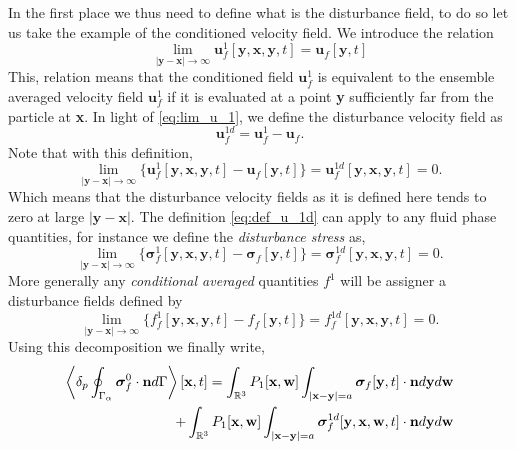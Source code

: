 In the first place we thus need to define what is the disturbance field, to do so let us take the example of the conditioned velocity field.
We introduce the relation 
\begin{equation}
    \lim_{|\textbf{y}-\textbf{x}|\to\infty} 
    \textbf{u}_f^1[\textbf{y},\textbf{x},\textbf{y},t]
    =
    \textbf{u}_f[\textbf{y},t]
    \label{eq:lim_u_1}
\end{equation} 
This, relation means that the conditioned field $\textbf{u}_f^1$ is equivalent to the ensemble averaged velocity field $\textbf{u}_f^1$ if it is evaluated at a point \textbf{y} sufficiently far from the particle at \textbf{x}. 
In light of \ref{eq:lim_u_1}, we define the disturbance velocity field as 
\begin{equation*}
    \textbf{u}_f^{1d}
    =
    \textbf{u}_f^1 
    - 
    \textbf{u}_f. 
    \label{eq:def_u_1d}
\end{equation*}
Note that with this definition, 
\begin{equation*}
    \lim_{|\textbf{y}-\textbf{x}|\to\infty} 
    \{\textbf{u}_f^1[\textbf{y},\textbf{x},\textbf{y},t]
    - \textbf{u}_f[\textbf{y},t]\}
    =
    \textbf{u}_f^{1d}[\textbf{y},\textbf{x},\textbf{y},t]
    = 0.
    \label{eq:lim_u_1d}
\end{equation*} 
Which means that the disturbance velocity fields as it is defined here tends to zero at large $|\textbf{y} - \textbf{x}|$.
The definition \ref{eq:def_u_1d} can apply to any fluid phase quantities,
for instance we define the \textit{disturbance stress} as,
\begin{equation*}
    \lim_{|\textbf{y}-\textbf{x}|\to\infty} 
    \{\bm\sigma_f^1[\textbf{y},\textbf{x},\textbf{y},t]
    - \bm\sigma_f[\textbf{y},t]\}
    =
    \bm\sigma_f^{1d}[\textbf{y},\textbf{x},\textbf{y},t]
    = 0.
\end{equation*} 
More generally any \textit{conditional averaged} quantities $f^1$ will be assigner a disturbance fields defined by 
\begin{equation*}
    \lim_{|\textbf{y}-\textbf{x}|\to\infty} 
    \{f_f^1[\textbf{y},\textbf{x},\textbf{y},t]
    - f_f[\textbf{y},t]\}
    =
    f_f^{1d}[\textbf{y},\textbf{x},\textbf{y},t]
    = 0.
\end{equation*} 
Using this decomposition we finally write, 
\begin{align*}
    \left<\delta_p \oint_{\Gamma_{\alpha}} \bm\sigma_f^0\cdot\textbf{n} d\Gamma\right>[\textbf{x},t]
    =
    \int_{\mathbb{R}^3}
    P_1[\textbf{x},\textbf{w}]
    \int_{|\textbf{x}-\textbf{y}|=a}
    \bm\sigma_f[\textbf{y},t]
    \cdot \textbf{n}
    d\textbf{y}
    d\textbf{w}\\
    + 
    \int_{\mathbb{R}^3}
    P_1[\textbf{x},\textbf{w}]
    \int_{|\textbf{x}-\textbf{y}|=a}
    \bm\sigma_f^{1d}[\textbf{y},\textbf{x},\textbf{w},t]
    \cdot \textbf{n}
    d\textbf{y}
    d\textbf{w}
\end{align*}
